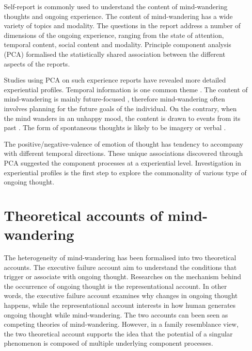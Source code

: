 Self-report is commonly used to understand the content of mind-wandering thoughts and ongoing experience. The content of mind-wandering has a wide variety of topics and modality. The questions in the report address a number of dimensions of the ongoing experience, ranging from the state of attention, temporal content, social content and modality. Principle component analysis (PCA) formalised the statistically shared association between the different aspects of the reports. 

Studies using PCA on such experience reports have revealed more detailed experiential profiles. Temporal information is one common theme \cite{RubyFP2013,RubyPlos2013}. The content of mind-wandering is mainly future-focused \cite{Baird2011}, therefore mind-wandering often involves planning for the future goals of the individual. On the contrary, when the mind wanders in an unhappy mood, the content is drawn to events from its past \cite{Smallwood2011}. The form of spontaneous thoughts is likely to be imagery or verbal \cite{Gorgolewski2014,Smallwood2016}. 

The positive/negative-valence of emotion of thought has tendency to accompany with different temporal directions. These unique associations discovered through PCA suggested the component processes at a experiential level. Investigation in experiential profiles is the first step to explore the commonality of various type of ongoing thought. 


\section{Theoretical accounts of mind-wandering}
\label{ch:intro:accounts}

The heterogeneity of mind-wandering has been formalised into two theoretical accounts. The executive failure account aim to understand the conditions that trigger or associate with ongoing thought. Researches on the mechanism behind the occurrence of ongoing thought is the representational account. In other words, the executive failure account examines why changes in ongoing thought happens, while the representational account interests in how human generates ongoing thought while mind-wandering. The two accounts can been seen as competing theories of mind-wandering. However, in a family resemblance view, the two theoretical account supports the idea that the potential of a singular phenomenon is composed of multiple underlying component processes. 
